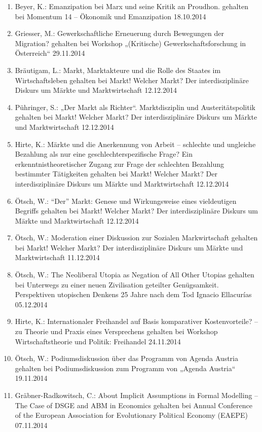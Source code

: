 \begin{enumerate}
	\item Beyer, K.: Emanzipation bei Marx und seine Kritik an Proudhon. gehalten bei Momentum 14 -- Ökonomik und Emanzipation 18.10.2014
	\item Griesser, M.: Gewerkschaftliche Erneuerung durch Bewegungen der Migration? gehalten bei Workshop „(Kritische) Gewerkschaftsforschung in Österreich“ 29.11.2014
	\item Bräutigam, L.: Markt, Marktakteure und die Rolle des Staates im Wirtschaftsleben gehalten bei Markt! Welcher Markt? Der interdisziplinäre Diskurs um Märkte und Marktwirtschaft 12.12.2014
	\item Pühringer, S.: „Der Markt als Richter“. Marktdisziplin und Austeritätspolitik gehalten bei Markt! Welcher Markt? Der interdisziplinäre Diskurs um Märkte und Marktwirtschaft 12.12.2014
	\item Hirte, K.: Märkte und die Anerkennung von Arbeit – schlechte und ungleiche Bezahlung als nur eine geschlechterspezifische Frage? Ein erkenntnistheoretischer Zugang zur Frage der schlechten Bezahlung bestimmter Tätigkeiten gehalten bei Markt! Welcher Markt? Der interdisziplinäre Diskurs um Märkte und Marktwirtschaft 12.12.2014
	\item Ötsch, W.: “Der” Markt: Genese und Wirkungsweise eines vieldeutigen Begriffs gehalten bei Markt! Welcher Markt? Der interdisziplinäre Diskurs um Märkte und Marktwirtschaft 12.12.2014
	\item Ötsch, W.: Moderation einer Diskussion zur Sozialen Markwirtschaft gehalten bei Markt! Welcher Markt? Der interdisziplinäre Diskurs um Märkte und Marktwirtschaft 11.12.2014
	\item Ötsch, W.: The Neoliberal Utopia as Negation of All Other Utopias gehalten bei Unterwegs zu einer neuen Zivilisation geteilter Genügsamkeit. Perspektiven utopischen Denkens 25 Jahre nach dem Tod Ignacio Ellacurías 05.12.2014
	\item Hirte, K.: Internationaler Freihandel auf Basis komparativer Kostenvorteile? -- zu Theorie und Praxis eines Versprechens gehalten bei Workshop Wirtschaftstheorie und Politik: Freihandel 24.11.2014
	\item Ötsch, W.: Podiumsdiskussion über das Programm von \glqq Agenda Austria\grqq{} gehalten bei Podiumsdiskussion zum Programm von „Agenda Austria“ 19.11.2014
	\item Gräbner-Radkowitsch, C.: About Implicit Assumptions in Formal Modelling – The Case of DSGE and ABM in Economics gehalten bei Annual Conference of the European Association for Evolutionary Political Economy (EAEPE) 07.11.2014

\end{enumerate}
